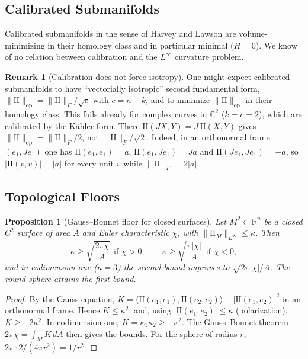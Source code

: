 \documentclass[11pt,reqno]{amsart}
\newtheorem{proposition}[theorem]{Proposition}
\theoremstyle{definition}
\newtheorem{remark}[theorem]{Remark}
\providecommand{\R}{\mathbb{R}}
\newcommand{\C}{\mathbb{C}}
\providecommand{\II}{\mathrm{I\!I}}
\newcommand{\op}{\mathrm{op}}
\numberwithin{equation}{section}
\providecommand{\II}{\mathrm{II}}
\providecommand{\R}{\mathbb{R}}
\begin{document}
\subsection{Calibrated Submanifolds}
Calibrated submanifolds in the sense of Harvey and Lawson \cite{harvey1982} are volume-minimizing in their homology class and in particular minimal ($H=0$). We know of no relation between calibration and the $L^\infty$ curvature problem.

\begin{remark}[Calibration does not force isotropy]
One might expect calibrated submanifolds to have ``vectorially isotropic'' second fundamental form, $\|\II\|_{\op} = \|\II\|_F/\sqrt{c}$ with $c = n-k$, and to minimize $\|\II\|_{\op}$ in their homology class. This fails already for complex curves in $\C^2$ ($k = c = 2$), which are calibrated by the K\"ahler form. There $\II(JX,Y) = J\,\II(X,Y)$ gives $\|\II\|_{\op} = \|\II\|_F/2$, not $\|\II\|_F/\sqrt2$. Indeed, in an orthonormal frame $(e_1, Je_1)$ one has $\II(e_1,e_1) = a$, $\II(e_1,Je_1) = Ja$ and $\II(Je_1,Je_1) = -a$, so $|\II(v,v)| = |a|$ for every unit $v$ while $\|\II\|_F = 2|a|$.
\end{remark}

\subsection{Topological Floors}

\begin{proposition}[Gauss--Bonnet floor for closed surfaces]
\label{prop:gauss_bonnet_floor}
Let $M^2 \subset \R^n$ be a closed $C^2$ surface of area $A$ and Euler characteristic $\chi$, with $\|\II_M\|_{L^\infty} \le \kappa$. Then
\begin{equation}
\kappa \ge \sqrt{\frac{2\pi\chi}{A}} \ \ \text{if } \chi > 0; \qquad \kappa \ge \sqrt{\frac{\pi|\chi|}{A}} \ \ \text{if } \chi < 0,
\end{equation}
and in codimension one ($n = 3$) the second bound improves to $\sqrt{2\pi|\chi|/A}$. The round sphere attains the first bound.
\end{proposition}

\begin{proof}
By the Gauss equation, $K = \langle \II(e_1,e_1), \II(e_2,e_2)\rangle - |\II(e_1,e_2)|^2$ in an orthonormal frame. Hence $K \le \kappa^2$, and, using $|\II(e_1,e_2)| \le \kappa$ (polarization), $K \ge -2\kappa^2$. In codimension one, $K = \kappa_1\kappa_2 \ge -\kappa^2$. The Gauss--Bonnet theorem $2\pi\chi = \int_M K\,dA$ then gives the bounds. For the sphere of radius $r$, $2\pi\cdot 2/(4\pi r^2) = 1/r^2$.
\end{proof}
\end{document}

